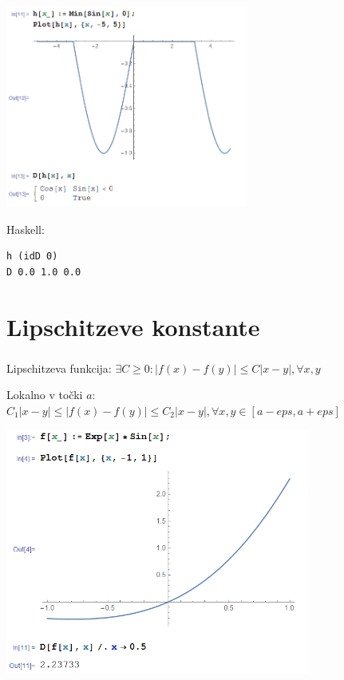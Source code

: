 \documentclass[9pt,table]{beamer}
\begin{document}
\begin{frame}[fragile]
\frametitle{}
\includegraphics[width=8cm]{graf4.png}

\pause
Haskell:
\begin{verbatim}
h (idD 0)
D 0.0 1.0 0.0
\end{verbatim}
\end{frame}


\section{Lipschitzeve konstante}

\begin{frame}
\frametitle{}\pause
Lipschitzeva funkcija: $\exists C\geq 0: |f(x)-f(y)|\leq C|x-y|, \forall x,y$ \pause

\vspace{10mm}
Lokalno v točki $a$: $C_1|x-y|\leq|f(x)-f(y)|\leq C_2|x-y|, \forall x,y \in [a-eps, a+eps]$
\end{frame}


\begin{frame}[fragile]
\includegraphics[width=10cm]{graf5.png}
\end{frame}
\end{document}
